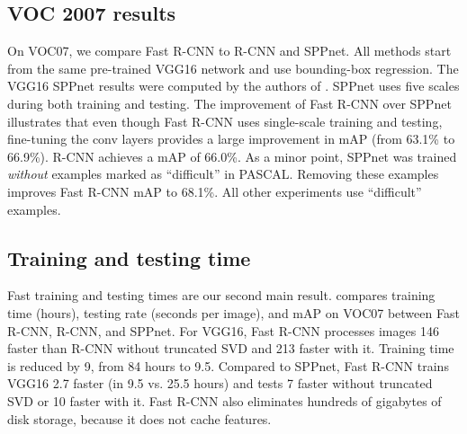 \documentclass[10pt,twocolumn,letterpaper]{article}
\newcommand{\X}{\xspace}
\newcommand{\vggsixteen}{VGG16\xspace}
\begin{document}
\subsection{VOC 2007 results}
On VOC07, we compare Fast R-CNN to R-CNN and SPPnet.
All methods start from the same pre-trained \vggsixteen network and use bounding-box regression.
The \vggsixteen SPPnet results were computed by the authors of \cite{he2014spp}.
SPPnet uses five scales during both training and testing.
The improvement of Fast R-CNN over SPPnet illustrates that even though Fast R-CNN uses single-scale training and testing, fine-tuning the conv layers provides a large improvement in mAP (from 63.1\% to 66.9\%).
R-CNN achieves a mAP of 66.0\%.
As a minor point, SPPnet was trained \emph{without} examples marked as ``difficult'' in PASCAL.
Removing these examples improves Fast R-CNN mAP to 68.1\%.
All other experiments use ``difficult'' examples.

\subsection{Training and testing time}
Fast training and testing times are our second main result.
 compares training time (hours), testing rate (seconds per image), and mAP on VOC07 between Fast R-CNN, R-CNN, and SPPnet.
For \vggsixteen, Fast R-CNN processes images 146\X faster than R-CNN without truncated SVD and 213\X faster with it.
Training time is reduced by 9\X, from 84 hours to 9.5.
Compared to SPPnet, Fast R-CNN trains \vggsixteen 2.7\X faster (in 9.5 vs. 25.5 hours) and tests 7\X faster without truncated SVD or 10\X faster with it.
Fast R-CNN also eliminates hundreds of gigabytes of disk storage, because it does not cache features.
\end{document}
